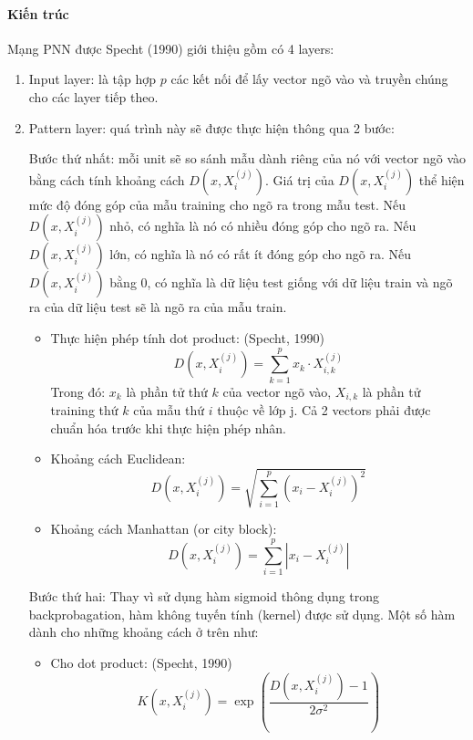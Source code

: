 \paragraph{Kiến trúc} Mạng PNN được Specht (1990) giới thiệu gồm có 4 layers: \cite{PNN-original} \cite{PNN_chapter}
\begin{enumerate}
	\item Input layer: là tập hợp $p$ các kết nối để lấy vector ngõ vào và truyền chúng cho các layer tiếp theo.
	\item Pattern layer: quá trình này sẽ được thực hiện thông qua 2 bước:
	
	Bước thứ nhất: mỗi unit sẽ so sánh mẫu dành riêng của nó với vector ngõ vào bằng cách tính khoảng cách $D(x, X_i^{(j)})$. Giá trị của $D(x, X_i^{(j)})$ thể hiện mức độ đóng góp của mẫu training cho ngõ ra trong mẫu test. Nếu $D(x, X_i^{(j)})$ nhỏ, có nghĩa là nó có nhiều đóng góp cho ngõ ra. Nếu $D(x, X_i^{(j)})$ lớn, có nghĩa là nó có rất ít đóng góp cho ngõ ra. Nếu $D(x, X_i^{(j)})$ bằng 0, có nghĩa là dữ liệu test giống với dữ liệu train và ngõ ra của dữ liệu test sẽ là ngõ ra của mẫu train. 
	\begin{itemize}
		\item Thực hiện phép tính dot product: (Specht, 1990)
		\begin{equation}
		D(x, X_i^{(j)}) = \sum^p_{k=1}x_k \cdot X_{i,k}^{(j)}
		\end{equation}
		Trong đó: $x_k$ là phần tử thứ $k$ của vector ngõ vào, $X_{i,k}$ là phần tử training thứ $k$ của mẫu thứ $i$ thuộc về lớp j. Cả 2 vectors phải được chuẩn hóa trước khi thực hiện phép nhân.
		\item Khoảng cách Euclidean:
		\begin{equation}
		D(x, X_i^{(j)}) = \sqrt{\sum ^p_{i=1}(x_i - X_i^{(j)})^2}
		\end{equation}
		\item Khoảng cách Manhattan (or city block):
		\begin{equation}
		D(x, X_i^{(j)}) = \sum ^p_{i=1}|x_i - X_i^{(j)}|
		\end{equation}
	\end{itemize}
	Bước thứ hai: Thay vì sử dụng hàm sigmoid thông dụng trong backprobagation, hàm không tuyến tính (kernel) được sử dụng. Một số hàm dành cho những khoảng cách ở trên như:
	\begin{itemize}
		\item Cho dot product: (Specht, 1990)
		\begin{equation}
		K(x, X_i^{(j)}) = \exp{(\frac{D(x, X_i^{(j)})-1}{2\sigma^2})}

\end{equation}
\end{itemize}
\end{enumerate}
